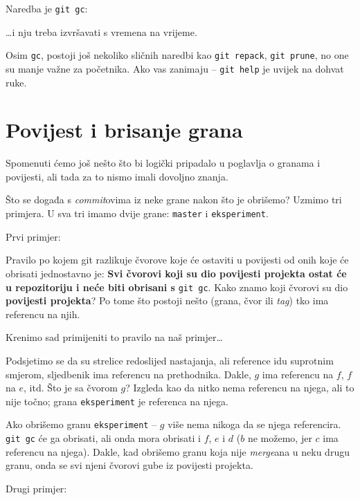 Naredba je \verb+git gc+:



\dots{}i nju treba izvršavati s vremena na vrijeme.

Osim \verb+gc+, postoji još nekoliko sličnih naredbi kao \verb+git repack+, \verb+git prune+, no one su manje važne za početnika.
Ako vas zanimaju -- \verb+git help+ je uvijek na dohvat ruke.

\section*{Povijest i brisanje grana}

Spomenuti ćemo još nešto što bi logički pripadalo u poglavlja o granama i povijesti, ali tada za to nismo imali dovoljno znanja.

Što se događa s \emph{commit}ovima iz neke grane nakon što je obrišemo?
Uzmimo tri primjera.
U sva tri imamo dvije grane: \verb+master+ i \verb+eksperiment+.

Prvi primjer:



Pravilo po kojem git razlikuje čvorove koje će ostaviti u povijesti od onih koje će obrisati jednostavno je:
\textbf{Svi čvorovi koji su dio povijesti projekta ostat će u repozitoriju i neće biti obrisani s} \verb+git gc+.
Kako znamo koji čvorovi su dio \textbf{povijesti projekta}?
Po tome što postoji nešto (grana, čvor ili \emph{tag}) tko ima referencu na njih.

Krenimo sad primijeniti to pravilo na naš primjer\dots

Podsjetimo se da su strelice redoslijed nastajanja, ali reference idu suprotnim smjerom, sljedbenik ima referencu na prethodnika.
Dakle, $g$ ima referencu na $f$, $f$ na $e$, itd.
Što je sa čvorom $g$? 
Izgleda kao da nitko nema referencu na njega, ali to nije točno; grana \verb+eksperiment+ je referenca na njega.

Ako obrišemo granu \verb+eksperiment+ -- $g$ više nema nikoga da se njega referencira.
\verb+git gc+ će ga obrisati, ali onda mora obrisati i $f$, $e$ i $d$ ($b$ ne možemo, jer $c$ ima referencu na njega).
Dakle, kad obrišemo granu koja nije \emph{merge}ana u neku drugu granu, onda se svi njeni čvorovi gube iz povijesti projekta.

Drugi primjer:



